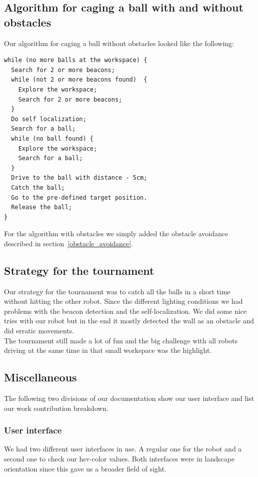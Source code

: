 \documentclass[703030]{./includes/iisreport}
\begin{document}
\subsection{Algorithm for caging a ball with and without obstacles}
Our algorithm for caging a ball without obstacles looked like the following:

\begin{lstlisting}[mathescape]
while (no more balls at the workspace) {
  Search for 2 or more beacons;
  while (not 2 or more beacons found)  {
    Explore the workspace;
    Search for 2 or more beacons;
  }
  Do self localization;
  Search for a ball;
  while (no ball found) {
    Explore the workspace;
    Search for a ball;
  }
  Drive to the ball with distance - 5cm;
  Catch the ball;
  Go to the pre-defined target position.
  Release the ball;
}
\end{lstlisting}

\noindent For the algorithm with obstacles we simply added the obstacle avoidance described
in section~\ref{obstacle_avoidance}.

\subsection{Strategy for the tournament}
Our strategy for the tournament was to catch all the balls in a short time without
hitting the other robot. Since the different lighting conditions we had problems with
the beacon detection and the self-localization. We did some nice tries with our robot but
in the end it mostly detected the wall as an obstacle and did erratic movements. \\
The tournament still made a lot of fun and the big challenge with all robots driving
at the same time in that small workspace was the highlight.

\subsection{Miscellaneous}
The following two divisions of our documentation show our user interface and list our
work contribution breakdown.

  \subsubsection{User interface}
  We had two different user interfaces in use. A regular one for the robot and a second one
  to check our hsv-color values. Both interfaces were in landscape orientation since this gave us 
  a broader field of sight. \\
    
\end{document}
